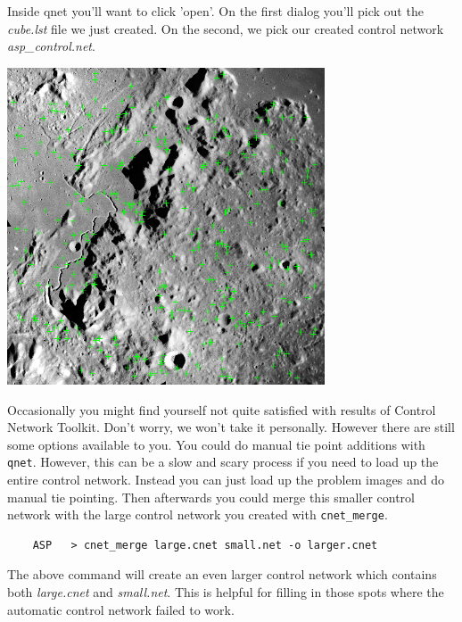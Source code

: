 Inside qnet you'll want to click 'open'. On the first dialog you'll
pick out the \emph{cube.lst} file we just created. On the second, we
pick our created control network \emph{asp\_control.net}.

\begin{center}
\includegraphics[height=3.7in]{images/cnettk_qnet_screen.png}
\end{center}

Occasionally you might find yourself not quite satisfied with results
of Control Network Toolkit. Don't worry, we won't take it
personally. However there are still some options available to you. You
could do manual tie point additions with \texttt{qnet}. However, this
can be a slow and scary process if you need to load up the entire
control network. Instead you can just load up the problem images and
do manual tie pointing. Then afterwards you could merge this smaller
control network with the large control network you created with
\texttt{cnet\_merge}.

\begin{verbatim}
    ASP   > cnet_merge large.cnet small.net -o larger.cnet
\end{verbatim}

The above command will create an even larger control network which
contains both \emph{large.cnet} and \emph{small.net}. This is helpful
for filling in those spots where the automatic control network failed
to work.
